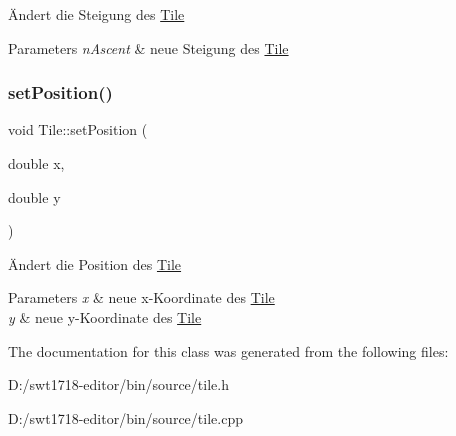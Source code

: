 Ändert die Steigung des \mbox{\hyperlink{class_tile}{Tile}} 
\begin{DoxyParams}{Parameters}
{\em n\+Ascent} & neue Steigung des \mbox{\hyperlink{class_tile}{Tile}} \\
\hline
\end{DoxyParams}
\mbox{\label{class_tile_a80d6dd0d052f39c01f8f261dfe53f08b}} 
\subsubsection{\texorpdfstring{set\+Position()}{setPosition()}}
{\footnotesize\ttfamily void Tile\+::set\+Position (\begin{DoxyParamCaption}\item[{double}]{x,  }\item[{double}]{y }\end{DoxyParamCaption})}

Ändert die Position des \mbox{\hyperlink{class_tile}{Tile}} 
\begin{DoxyParams}{Parameters}
{\em x} & neue x-\/\+Koordinate des \mbox{\hyperlink{class_tile}{Tile}} \\
\hline
{\em y} & neue y-\/\+Koordinate des \mbox{\hyperlink{class_tile}{Tile}} \\
\hline
\end{DoxyParams}


The documentation for this class was generated from the following files\+:\begin{DoxyCompactItemize}
\item 
D\+:/swt1718-\/editor/bin/source/tile.\+h\item 
D\+:/swt1718-\/editor/bin/source/tile.\+cpp\end{DoxyCompactItemize}
